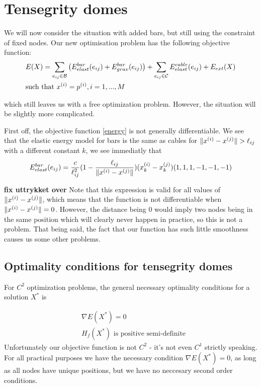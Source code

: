 \section{Tensegrity domes}
We will now consider the situation with added bars, but still using the constraint of fixed nodes. Our new optimisation problem has the following objective function:
\begin{equation}
\begin{aligned}
    \label{energy}
    &E(X) = \sum\limits_{e_{ij} \in \mathcal{B}}\big(E^{bar}_{elast}(e_{ij}) + E^{bar}_{grav}(e_{ij})\big) + \sum\limits_{e_{ij} \in \mathcal{C}} E^{cable}_{elast}(e_{ij}) + E_{ext}(X) \\
    & \text{such that } x^{(i)} = p^{(i)}, i=1,...,M
\end{aligned}
\end{equation}

which still leaves us with a free optimization problem. However, the situation will be slightly more complicated.

First off, the objective function \eqref{energy} is not generally differentiable. We see that the elastic energy model for bars is the same as cables for $\lVert x^{(i)} - x^{(j)}\rVert > \ell_{ij}$ with a different constant $k$, we see immediatly that
\begin{equation*}
E^{bar}_{elast}(e_{ij}) = \frac{c}{\ell_{ij}^2} (1- \frac{\ell_{ij}}{\lVert x^{(i)} - x^{(j)}\rVert}) (x_k^{(i)} - x_k^{(j)}) ( 1, 1, 1,-1,-1,-1)
\end{equation*}

\textbf{fix uttrykket over}
Note that this expression is valid for all values of $\lVert x^{(i)} - x^{(j)}\rVert$, which means that the function is not differentiable when $\lVert x^{(i)} - x^{(j)}\rVert = 0$. However, the distance being $0$ would imply two nodes being in the same position which will clearly never happen in practice, so this is not a problem. That being said, the fact that our function has such little smoothness causes us some other problems.

\subsection{Optimality conditions for tensegrity domes}
For $C^2$ optimization problems, the general necessary optimality conditions for a solution $X^*$ is

\begin{align*}
    &\nabla E(X^*) = 0\\
    & H_f(X^*) \text{ is positive semi-definite}
\end{align*}
Unfortunately our objective function is not $C^2$ - it's not even $C^1$ strictly speaking. For all practical purposes we have the necessary condition $\nabla E(X^*) = 0$, as long as all nodes have unique positions, but we have no neccesary second order conditions.

